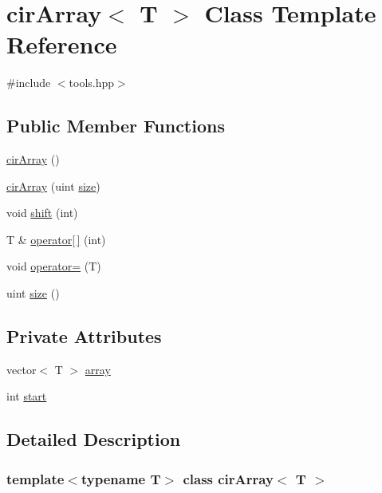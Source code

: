 \hypertarget{classcirArray}{}\section{cir\+Array$<$ T $>$ Class Template Reference}
\label{classcirArray}


{\ttfamily \#include $<$tools.\+hpp$>$}

\subsection*{Public Member Functions}
\begin{DoxyCompactItemize}
\item 
\mbox{\hyperlink{classcirArray_a4ff569017124082def843f2c36725075}{cir\+Array}} ()
\item 
\mbox{\hyperlink{classcirArray_a2241cbe0754475c1ebc4a095cedaecdd}{cir\+Array}} (uint \mbox{\hyperlink{classcirArray_a45cd2458054ae24982c2cf816292c1e1}{size}})
\item 
void \mbox{\hyperlink{classcirArray_a2d6c6f8c6692176f387c44dd53c67e8c}{shift}} (int)
\item 
T \& \mbox{\hyperlink{classcirArray_a523faf5369bc1dd91750a9106ee2d553}{operator\mbox{[}$\,$\mbox{]}}} (int)
\item 
void \mbox{\hyperlink{classcirArray_a6c8bd228590d2a4a577bdf3fe78cf58d}{operator=}} (T)
\item 
uint \mbox{\hyperlink{classcirArray_a45cd2458054ae24982c2cf816292c1e1}{size}} ()
\end{DoxyCompactItemize}
\subsection*{Private Attributes}
\begin{DoxyCompactItemize}
\item 
vector$<$ T $>$ \mbox{\hyperlink{classcirArray_ac0064a9a3b5f975c5cfea0909e4d4907}{array}}
\item 
int \mbox{\hyperlink{classcirArray_a7233e3d591e61dee5a16656f3db8f386}{start}}
\end{DoxyCompactItemize}


\subsection{Detailed Description}
\subsubsection*{template$<$typename T$>$\newline
class cir\+Array$<$ T $>$}

